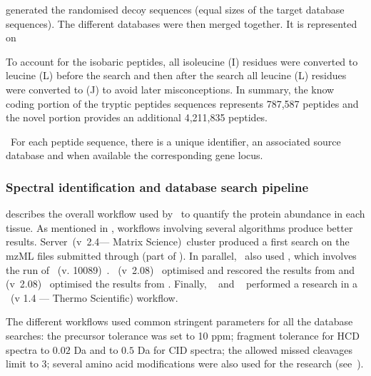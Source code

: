  generated the randomised
decoy sequences (equal sizes of the target database sequences).
The different databases were then merged together.
It is represented on 

To account for the isobaric peptides, all isoleucine (I) residues were
converted to leucine (L) before the search and then after the search all leucine
(L) residues were converted to (J) to avoid later misconceptions.
In summary, the know coding portion of the tryptic peptides sequences represents
787,587 peptides and the novel portion provides an additional 4,211,835 peptides.

\NB\ For each peptide sequence, there is a unique identifier,
an associated source database
and when available the corresponding gene locus.

\subsubsection{Spectral identification and database search pipeline}%
\label{subsub:spectralIDDBsearch}

 describes the overall workflow used by
\james\ to quantify the protein abundance in each tissue. As mentioned in
, workflows involving several algorithms produce
better results.  Server~(v~2.4--- Matrix Science)~cluster produced
a first search on the mzML files submitted through 
(part of ). In parallel, \james\ also used  ,
which involves the run of ~(v. 10089)~.
~(v~2.08)~
optimised and rescored the results from  and
 (v~2.08)~ optimised
the results from .
Finally, ~ and
~ performed a research in a
~(v 1.4 --- Thermo Scientific) workflow.

The different workflows used common stringent parameters for all the database
searches:
the precursor tolerance was set to 10 \gls{ppm};
fragment tolerance for \gls{HCD} spectra to $0.02$ \gls{Da} and
to $0.5$ \gls{Da} for \gls{CID} spectra;
the allowed missed cleavages limit to $3$; several amino acid modifications were
also used for the research (see~).

